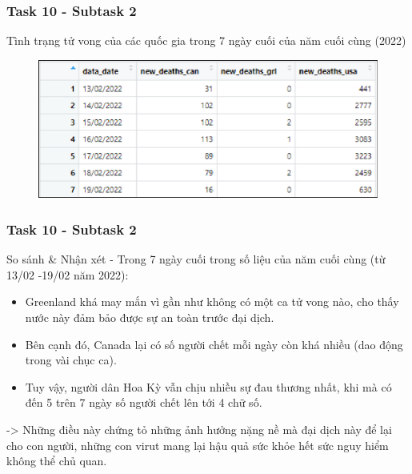 \documentclass[english,10pt,table]{beamer}
\begin{document}
\frame
{
    \frametitle{Task 10 - Subtask 2}
    \begin{block}{Tình trạng tử vong của các quốc gia trong 7 ngày cuối của năm cuối cùng (2022)}
	\begin{figure}[H]
        \centering
        \includegraphics[scale=0.3]{images/10.2.png}
    \end{figure}
    \end{block}
}
\frame
{
    \frametitle{Task 10 - Subtask 2}
    \begin{block}{So sánh \& Nhận xét}
	-  Trong 7 ngày cuối trong số liệu của năm cuối cùng (từ 13/02 -19/02 năm 2022):\\
    \begin{itemize}
        \item Greenland khá may mắn vì gần như không có một ca tử vong nào, cho thấy nước này đảm bảo được sự an toàn trước đại dịch.\\
        \item Bên cạnh đó, Canada lại có số người chết mỗi ngày còn khá nhiều (dao động trong vài chục ca).\\
        \item Tuy vậy, người dân Hoa Kỳ vẫn chịu nhiều sự đau thương nhất, khi mà có đến 5 trên 7 ngày số người chết lên tới 4 chữ số.\\
        \end{itemize}
    -> Những điều này chứng tỏ những ảnh hưởng nặng nề mà đại dịch này để lại cho con người, những con virut mang lại hậu quả sức khỏe hết sức nguy hiểm không thể chủ quan.\\
   \end{block}
}
\frame
\end{document}
